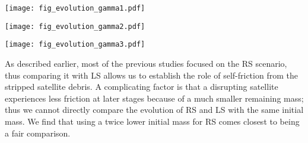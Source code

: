 \documentclass[twocolumn]{aastex63}
\newcommand{\LS}{\textsf{L\!S}\xspace}
\newcommand{\RS}{\textsf{R\!S}\xspace}
\begin{document}
\begin{figure*}
\texttt{[image: fig\_evolution\_gamma1.pdf]}
\caption{Evolution of satellite orbits in the $\gamma=1$ case. From top to bottom: distance between the host and the satellite centres (solid lines) and the semimajor axis of the satellite orbit (dashed lines); circularity $\eta \equiv L/L_\mathrm{circ}(E)$; bound mass. Different columns show mass ratios 1:5 (left), 1:10 (centre) and 1:20 (right), and different colours -- initial circularity 0.8 (blue), 0.5 (green) and 0.3 (red).
}  \label{fig:evolution_gamma1}
\end{figure*}

\begin{figure*}
\texttt{[image: fig\_evolution\_gamma2.pdf]}
\caption{Same as Figure~\ref{fig:evolution_gamma1}, but for the case $\gamma=2$. In the central panel, we additionally show the evolution of circularity in the two simulations with anisotropic host galaxies (dotted -- radial, dot-dashed -- tangential).
}  \label{fig:evolution_gamma2}
\end{figure*}

\begin{figure*}
\texttt{[image: fig\_evolution\_gamma3.pdf]}
\caption{Same as Figure~\ref{fig:evolution_gamma1}, but for the case $\gamma=3$.
}  \label{fig:evolution_gamma3}
\end{figure*}

As described earlier, most of the previous studies focused on the \RS scenario, thus comparing it with \LS allows us to establish the role of self-friction from the stripped satellite debris. A complicating factor is that a disrupting satellite experiences less friction at later stages because of a much smaller remaining mass; thus we cannot directly compare the evolution of \RS and \LS with the same initial mass. We find that using a twice lower initial mass for \RS comes closest to being a fair comparison.
\end{document}
